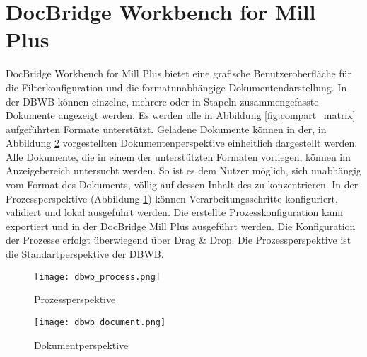 \section{DocBridge Workbench for Mill Plus}{
\label{sec:DBWB}
DocBridge Workbench for Mill Plus bietet eine grafische Benutzeroberfläche für die Filterkonfiguration und die formatunabhängige Dokumentendarstellung. In der \ac{DBWB} können einzelne, mehrere oder in Stapeln zusammengefasste Dokumente angezeigt werden. Es werden alle in Abbildung \ref{fig:compart_matrix} aufgeführten Formate unterstützt. Geladene Dokumente können in der, in Abbildung \ref{fig:dbwb_document} vorgestellten Dokumentenperspektive einheitlich dargestellt werden. Alle Dokumente, die in einem der unterstützten Formaten vorliegen, können im Anzeigebereich untersucht werden. So ist es dem Nutzer möglich, sich unabhängig vom Format des Dokuments, völlig auf dessen Inhalt des zu konzentrieren. In der Prozessperspektive (Abbildung \ref{fig:dbwb_process}) können Verarbeitungsschritte konfiguriert, validiert und lokal ausgeführt werden. Die erstellte Prozesskonfiguration kann exportiert und in der DocBridge Mill Plus ausgeführt werden. Die Konfiguration der Prozesse erfolgt überwiegend über Drag \& Drop. Die Prozessperspektive ist die Standartperspektive der \ac{DBWB}.     

\newpage

\begin{figure}[htbp] 
\centering
     \texttt{[image: dbwb\_process.png]}
  \caption{Prozessperspektive}
  \label{fig:dbwb_process}
\end{figure}

\begin{figure}[htbp] 
\centering
     \texttt{[image: dbwb\_document.png]}
  \caption{Dokumentperspektive}
  \label{fig:dbwb_document}
\end{figure}


}
\newpage

